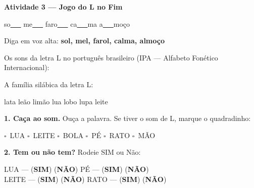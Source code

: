 \begin{consolidacao}
\textbf{Atividade 3 --- Jogo do L no Fim}


\begin{center}
so\underline{~~~} \quad me\underline{~~~} \quad faro\underline{~~~} \quad ca\underline{~~~}ma \quad a\underline{~~~}mo\c{c}o
\end{center}
Diga em voz alta: \textbf{sol, mel, farol, calma, almo\c{c}o}

\end{consolidacao}


\begin{sonsdaletra}
Os sons da letra L no portugu\^es{} brasileiro (IPA --- Alfabeto Fon\'etico Internacional):

\end{sonsdaletra}


\begin{familiasilabica}
A fam\'ilia sil\'abica da letra L:

\begin{center}
lata \quad le\~a{}o \quad lim\~a{}o \quad lua \quad lobo \quad lupa \quad leite
\end{center}
\end{familiasilabica}


\begin{somletra}
\textbf{1. Ca\c{c}a ao som.} Ou\c{c}a a palavra. Se tiver o som de L, marque o quadradinho:
\begin{center}
$\square$~LUA \quad $\square$~LEITE \quad $\square$~BOLA \quad $\square$~P\'E \quad $\square$~RATO \quad $\square$~M\~AO
\end{center}

\textbf{2. Tem ou n\~ao{} tem?} Rodeie SIM ou N\~ao:
\begin{center}
LUA --- (\textbf{SIM}) (\textbf{N\~AO}) \quad P\'E --- (\textbf{SIM}) (\textbf{N\~AO}) \\ LEITE --- (\textbf{SIM}) (\textbf{N\~AO}) \quad RATO --- (\textbf{SIM}) (\textbf{N\~AO})
\end{center}
\end{somletra}

